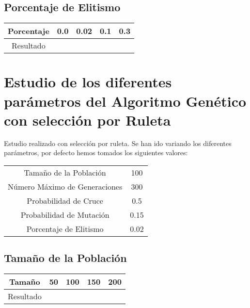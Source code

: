 \documentclass[12pt]{article}
\begin{document}
	

\subsection{Porcentaje de Elitismo}
\begin{table}[H]
\begin{center}
\begin{tabular}{|ccccc|} \hline
Porcentaje   & 0.0 & 0.02 & 0.1 & 0.3 \\  \hline
Resultado  &   &  &  &  \\ \hline
\end{tabular}
\end{center}
\end{table}


\section{Estudio de los diferentes parámetros del Algoritmo Genético con selección por Ruleta}

	Estudio realizado con selección por ruleta. Se han ido variando los diferentes parámetros, por defecto hemos tomados los siguientes valores:

\begin{table}[H]
\begin{center}
\begin{tabular}{|cc|} \hline
Tamaño de la Población   & 100  \\  
Número Máximo de Generaciones  &  300 \\
Probabilidad de Cruce & 0.5 \\
Probabilidad de Mutación & 0.15 \\
Porcentaje de Elitismo & 0.02 \\ \hline
\end{tabular}
\end{center}
\end{table}


\subsection{Tamaño de la Población}

\begin{table}[H]
\begin{center}
\begin{tabular}{|ccccc|} \hline
Tamaño	   & 50 & 100 & 150 & 200 \\  \hline
Resultado  &   &  &  &  \\ \hline
\end{tabular}
\end{center}
\end{table}
\end{document}
